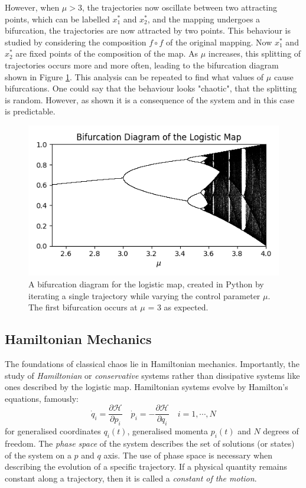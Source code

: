 \documentclass[12pt,a4paper]{amsart}
\begin{document}
However, when $\mu > 3$, the trajectories now oscillate between two attracting points, which can be labelled $x_{1}^{*}$ and $x_{2}^{*}$, and the mapping undergoes a bifurcation, the trajectories are now attracted by two points. This behaviour is studied by considering the composition $f \circ f$ of the original mapping. Now $x_{1}^{*}$ and $x_{2}^{*}$ are fixed points of the composition of the map. As $\mu$ increases, this splitting of trajectories occurs more and more often, leading to the bifurcation diagram shown in Figure \ref{fig:bif}. This analysis can be repeated to find what values of $\mu$ cause bifurcations. One could say that the behaviour looks "chaotic", that the splitting is random. However, as shown it is a consequence of the system and in this case is predictable.

\begin{figure}[h] 
    \centering
    \includegraphics[scale=0.8]{logistic_map_bifur.png}
    \caption{A bifurcation diagram for the logistic map, created in Python by iterating a single trajectory while varying the control parameter $\mu$. The first bifurcation occurs at $\mu$ = 3 as expected.}
    \label{fig:bif}
\end{figure}

\newpage

\subsection{Hamiltonian Mechanics}

The foundations of classical chaos lie in Hamiltonian mechanics. Importantly, the study of \textit{Hamiltonian} or \textit{conservative} systems rather than dissipative systems like ones described by the logistic map. Hamiltonian systems evolve by Hamilton's equations, famously:
$$\dot{q}_{i} = \frac{\partial \mathcal{H}}{\partial p_{i}} \quad \dot{p}_{i} = -\frac{\partial \mathcal{H}}{\partial q_{i}} \quad i = 1, \cdots , N$$
for generalised coordinates $q_{i}(t)$, generalised momenta $p_{i}(t)$ and $N$ degrees of freedom. The \textit{phase space} of the system describes the set of solutions (or states) of the system on a $p$ and $q$ axis. The use of phase space is necessary when describing the evolution of a specific trajectory. If a physical quantity remains constant along a trajectory, then it is called a \textit{constant of the motion}. 
\end{document}
